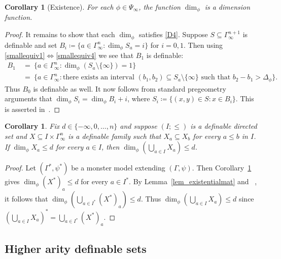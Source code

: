 \documentclass[11pt]{amsart}
\theoremstyle{plain}
\newtheorem{cor}[thm]{Corollary}
\theoremstyle{definition}
\numberwithin{equation}{section}
\newcommand\0{\varnothing}
\begin{document}
\begin{cor}[Existence]\label{dimension_theorem_existence}
For each $\phi\in\Psi_{\infty}$, the function $\dim_{\phi}$ is a dimension function.
\end{cor}
\begin{proof}
It remains to show that each $\dim_{\phi}$ satisfies \ref{D4}. 
Suppose $S\subseteq\Gamma_{\infty}^{n+1}$ is definable and set $B_i\coloneqq\{a\in\Gamma_{\infty}^n:\dim_{\phi}S_a=i\}$ for $i=0,1$. Then using \eqref{smallequiv1}$\Leftrightarrow$\eqref{smallequiv4} we see that $B_1$ is definable:
\begin{align*}
B_1 \ &= \ \{a\in\Gamma_{\infty}^n:\dim_{\phi}(S_a\setminus\{\infty\})=1\} \\
&= \ \{a\in\Gamma_{\infty}^n:\text{there exists an interval $(b_1,b_2)\subseteq S_a\setminus\{\infty\}$ such that $b_2-b_1>\Delta_{\phi}$}\}.
\end{align*}
Thus $B_0$ is definable as well. 
It now follows from standard pregeometry arguments that $\dim_{\phi}S_i=\dim_{\phi}B_i+i$, where $S_i\coloneqq\{(x,y)\in S:x\in B_i\}$. This is asserted 
in~\cite[Proposition 2.8(2)]{angel2016bounded}.
\end{proof}








\begin{cor}\label{dim_directed_union_fact}
Fix $d\in\{-\infty,0,\ldots,n\}$ and suppose $(I;\leq)$ is a definable directed set and $X\subseteq I\times\Gamma^n_{\infty}$ is a definable family such that $X_a\subseteq X_b$ for every $a\leq b$ in $I$. If $\dim_{\phi}X_a\leq d$ for every $a\in I$, then $\dim_{\phi}(\bigcup_{a\in I}X_a)\leq d$.
\end{cor}
\begin{proof}
Let $(\Gamma^*,\psi^*)$ be a monster model extending $(\Gamma,\psi)$. Then Corollary~\ref{dimension_theorem_existence} gives $\dim_{\phi}(X^*)_a\leq d$ for every $a\in I^*$. By Lemma~\ref{lem_existentialmat} and ~\cite[Lemma 3.71]{fornasiero-dimmatroiddense}, it follows that $\dim_{\phi}(\bigcup_{a\in I^*}(X^*)_a)\leq d$. Thus $\dim_{\phi}(\bigcup_{a\in I}X_a)\leq d$ since $(\bigcup_{a\in I}X_a)^*=\bigcup_{a\in I^*}(X^*)_a$. \end{proof}

\subsection{Higher arity definable sets}\label{KSST_VSST_subsection}
\end{document}
